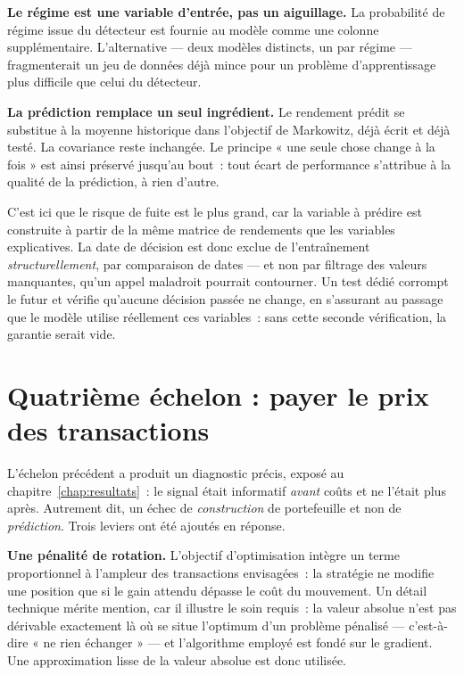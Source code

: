 \textbf{Le régime est une variable d'entrée, pas un aiguillage.} La probabilité
de régime issue du détecteur est fournie au modèle comme une colonne
supplémentaire. L'alternative — deux modèles distincts, un par régime —
fragmenterait un jeu de données déjà mince pour un problème d'apprentissage plus
difficile que celui du détecteur.

\textbf{La prédiction remplace un seul ingrédient.} Le rendement prédit se
substitue à la moyenne historique dans l'objectif de Markowitz, déjà écrit et
déjà testé. La covariance reste inchangée. Le principe « une seule chose change
à la fois » est ainsi préservé jusqu'au bout~: tout écart de performance
s'attribue à la qualité de la prédiction, à rien d'autre.

\begin{remarquebox}
C'est ici que le risque de fuite est le plus grand, car la variable à prédire est
construite à partir de la même matrice de rendements que les variables
explicatives. La date de décision est donc exclue de l'entraînement
\emph{structurellement}, par comparaison de dates — et non par filtrage des
valeurs manquantes, qu'un appel maladroit pourrait contourner. Un test dédié
corrompt le futur et vérifie qu'aucune décision passée ne change, en s'assurant
au passage que le modèle utilise réellement ces variables~: sans cette seconde
vérification, la garantie serait vide.
\end{remarquebox}

\section{Quatrième échelon : payer le prix des transactions}

L'échelon précédent a produit un diagnostic précis, exposé au
chapitre~\ref{chap:resultats}~: le signal était informatif \emph{avant} coûts et
ne l'était plus après. Autrement dit, un échec de \emph{construction} de
portefeuille et non de \emph{prédiction}. Trois leviers ont été ajoutés en
réponse.

\textbf{Une pénalité de rotation.} L'objectif d'optimisation intègre un terme
proportionnel à l'ampleur des transactions envisagées~: la stratégie ne modifie
une position que si le gain attendu dépasse le coût du mouvement. Un détail
technique mérite mention, car il illustre le soin requis~: la valeur absolue
n'est pas dérivable exactement là où se situe l'optimum d'un problème pénalisé —
c'est-à-dire « ne rien échanger » — et l'algorithme employé est fondé sur le
gradient. Une approximation lisse de la valeur absolue est donc utilisée.

